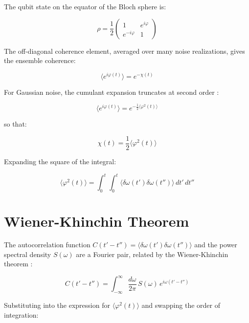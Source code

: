 \documentclass[12pt]{article}
\begin{document}
The qubit state on the equator of the Bloch sphere is:

\begin{equation}
    \rho = \frac{1}{2}\begin{pmatrix} 1 & e^{i\varphi} \\ e^{-i\varphi} & 1 \end{pmatrix}
\end{equation}

The off-diagonal coherence element, averaged over many noise realizations, gives the ensemble coherence:

\begin{equation}
    \langle e^{i\varphi(t)} \rangle = e^{-\chi(t)}
\end{equation}

For Gaussian noise, the cumulant expansion truncates at second order \cite{Kubo1962}:

\begin{equation}
    \langle e^{i\varphi(t)} \rangle = e^{-\frac{1}{2}\langle \varphi^2(t) \rangle}
\end{equation}

so that:

\begin{equation}
    \chi(t) = \frac{1}{2}\langle \varphi^2(t) \rangle
\end{equation}

Expanding the square of the integral:

\begin{equation}
    \langle \varphi^2(t) \rangle = \int_0^t \int_0^t \langle \delta\omega(t')\delta\omega(t'')\rangle\, dt'\, dt''
\end{equation}

\section{Wiener-Khinchin Theorem}

The autocorrelation function $C(t' - t'') = \langle \delta\omega(t')\delta\omega(t'')\rangle$ and the power spectral density $S(\omega)$ are a Fourier pair, related by the Wiener-Khinchin theorem \cite{Wiener1930}:

\begin{equation}
    C(t' - t'') = \int_{-\infty}^{\infty} \frac{d\omega}{2\pi}\, S(\omega)\, e^{i\omega(t' - t'')}
\end{equation}

Substituting into the expression for $\langle \varphi^2(t) \rangle$ and swapping the order of integration:
\end{document}
